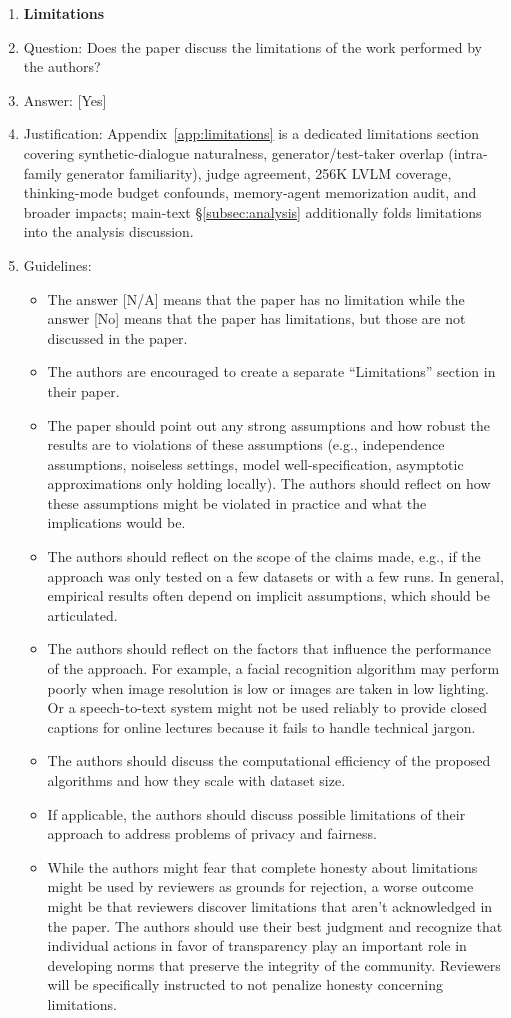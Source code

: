 \documentclass{llmxive}
\providecommand{\answerYes}[1][]{[Yes]#1}
\providecommand{\answerNo}[1][]{[No]#1}
\providecommand{\answerNA}[1][]{[N/A]#1}
\begin{document}
\begin{enumerate}
\item {\bf Limitations}
    \item[] Question: Does the paper discuss the limitations of the work performed by the authors?
    \item[] Answer: \answerYes{}
    \item[] Justification: Appendix~\ref{app:limitations} is a dedicated limitations section covering synthetic-dialogue naturalness, generator/test-taker overlap (intra-family generator familiarity), judge agreement, 256K LVLM coverage, thinking-mode budget confounds, memory-agent memorization audit, and broader impacts; main-text \S\ref{subsec:analysis} additionally folds limitations into the analysis discussion.
    \item[] Guidelines:
    \begin{itemize}
        \item The answer \answerNA{} means that the paper has no limitation while the answer \answerNo{} means that the paper has limitations, but those are not discussed in the paper.
        \item The authors are encouraged to create a separate ``Limitations'' section in their paper.
        \item The paper should point out any strong assumptions and how robust the results are to violations of these assumptions (e.g., independence assumptions, noiseless settings, model well-specification, asymptotic approximations only holding locally). The authors should reflect on how these assumptions might be violated in practice and what the implications would be.
        \item The authors should reflect on the scope of the claims made, e.g., if the approach was only tested on a few datasets or with a few runs. In general, empirical results often depend on implicit assumptions, which should be articulated.
        \item The authors should reflect on the factors that influence the performance of the approach. For example, a facial recognition algorithm may perform poorly when image resolution is low or images are taken in low lighting. Or a speech-to-text system might not be used reliably to provide closed captions for online lectures because it fails to handle technical jargon.
        \item The authors should discuss the computational efficiency of the proposed algorithms and how they scale with dataset size.
        \item If applicable, the authors should discuss possible limitations of their approach to address problems of privacy and fairness.
        \item While the authors might fear that complete honesty about limitations might be used by reviewers as grounds for rejection, a worse outcome might be that reviewers discover limitations that aren't acknowledged in the paper. The authors should use their best judgment and recognize that individual actions in favor of transparency play an important role in developing norms that preserve the integrity of the community. Reviewers will be specifically instructed to not penalize honesty concerning limitations.
    \end{itemize}


\end{enumerate}
\end{document}
